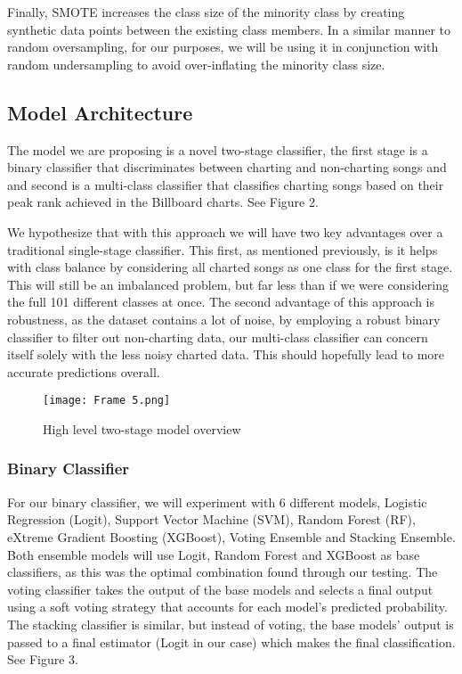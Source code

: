 \documentclass[conference]{IEEEtran}
\begin{document}
Finally, SMOTE increases the class size of the minority class by creating synthetic data points between the existing class members. In a similar manner to random oversampling, for our purposes, we will be using it in conjunction with random undersampling to avoid over-inflating the minority class size.

\subsection{Model Architecture}
The model we are proposing is a novel two-stage classifier, the first stage is a binary classifier that discriminates between charting and non-charting songs and and second is a multi-class classifier that classifies charting songs based on their peak rank achieved in the Billboard charts. See Figure 2.

We hypothesize that with this approach we will have two key advantages over a traditional single-stage classifier. This first, as mentioned previously, is it helps with class balance by considering all charted songs as one class for the first stage. This will still be an imbalanced problem, but far less than if we were considering the full 101 different classes at once. The second advantage of this approach is robustness, as the dataset contains a lot of noise, by employing a robust binary classifier to filter out non-charting data, our multi-class classifier can concern itself solely with the less noisy charted data. This should hopefully lead to more accurate predictions overall.

\begin{figure}[htbp]
\centerline{\texttt{[image: Frame 5.png]}}
\caption{High level two-stage model overview}
\label{fig2}
\end{figure}

\subsubsection{Binary Classifier}
For our binary classifier, we will experiment with 6 different models, Logistic Regression (Logit), Support Vector Machine (SVM), Random Forest (RF), eXtreme Gradient Boosting (XGBoost), Voting Ensemble and Stacking Ensemble. Both ensemble models will use Logit, Random Forest and XGBoost as base classifiers, as this was the optimal combination found through our testing. The voting classifier takes the output of the base models and selects a final output using a soft voting strategy that accounts for each model's predicted probability. The stacking classifier is similar, but instead of voting, the base models' output is passed to a final estimator (Logit in our case) which makes the final classification. See Figure 3.
\end{document}
